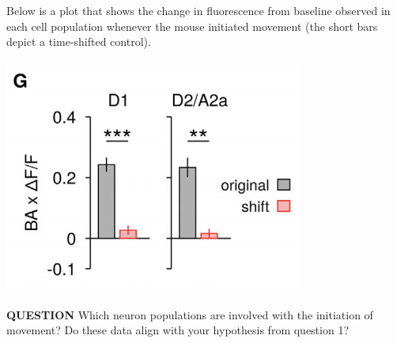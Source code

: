\documentclass{article}
\begin{document}
Below is a plot that shows the change in fluorescence from baseline observed in each cell population whenever the mouse initiated movement (the short bars depict a time-shifted control).\\\\
\includegraphics[]{2.3.png}\\\\
\textbf{QUESTION} Which neuron populations are involved with the initiation of movement? Do these data align with your hypothesis from question 1?
\end{document}
